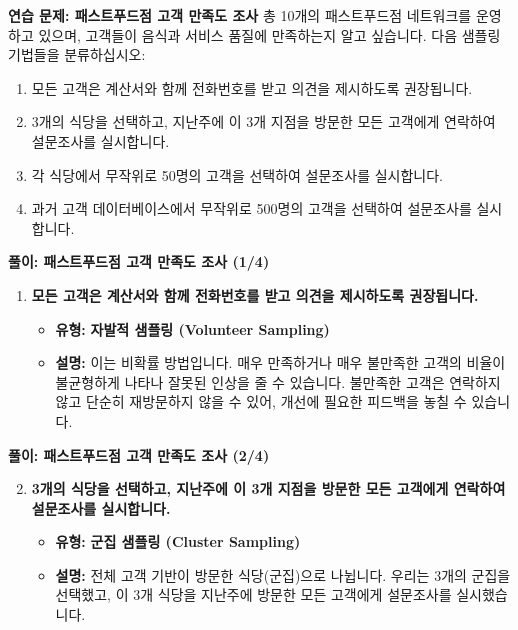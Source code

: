 \documentclass[11pt,a4paper]{book}
\newcommand{\concept}[1]{\textbf{#1}}
\theoremstyle{definition}
\begin{document}
\begin{practicebox}
\textbf{연습 문제: 패스트푸드점 고객 만족도 조사}
총 10개의 패스트푸드점 네트워크를 운영하고 있으며, 고객들이 음식과 서비스 품질에 만족하는지 알고 싶습니다. 다음 샘플링 기법들을 분류하십시오:
\begin{enumerate}
    \item 모든 고객은 계산서와 함께 전화번호를 받고 의견을 제시하도록 권장됩니다.
    \item 3개의 식당을 선택하고, 지난주에 이 3개 지점을 방문한 모든 고객에게 연락하여 설문조사를 실시합니다.
    \item 각 식당에서 무작위로 50명의 고객을 선택하여 설문조사를 실시합니다.
    \item 과거 고객 데이터베이스에서 무작위로 500명의 고객을 선택하여 설문조사를 실시합니다.
\end{enumerate}
\end{practicebox}

\begin{solutionbox}
\textbf{풀이: 패스트푸드점 고객 만족도 조사 (1/4)}
\begin{enumerate}
    \item \textbf{모든 고객은 계산서와 함께 전화번호를 받고 의견을 제시하도록 권장됩니다.}
    \begin{itemize}
        \item \textbf{유형:} \concept{자발적 샘플링 (Volunteer Sampling)}
        \item \textbf{설명:} 이는 비확률 방법입니다. 매우 만족하거나 매우 불만족한 고객의 비율이 불균형하게 나타나 잘못된 인상을 줄 수 있습니다. 불만족한 고객은 연락하지 않고 단순히 재방문하지 않을 수 있어, 개선에 필요한 피드백을 놓칠 수 있습니다.
    \end{itemize}
\end{enumerate}
\end{solutionbox}

\begin{solutionbox}
\textbf{풀이: 패스트푸드점 고객 만족도 조사 (2/4)}
\begin{enumerate}
    \setcounter{enumi}{1}
    \item \textbf{3개의 식당을 선택하고, 지난주에 이 3개 지점을 방문한 모든 고객에게 연락하여 설문조사를 실시합니다.}
    \begin{itemize}
        \item \textbf{유형:} \concept{군집 샘플링 (Cluster Sampling)}
        \item \textbf{설명:} 전체 고객 기반이 방문한 식당(군집)으로 나뉩니다. 우리는 3개의 군집을 선택했고, 이 3개 식당을 지난주에 방문한 모든 고객에게 설문조사를 실시했습니다.
    \end{itemize}
\end{enumerate}
\end{solutionbox}
\end{document}
